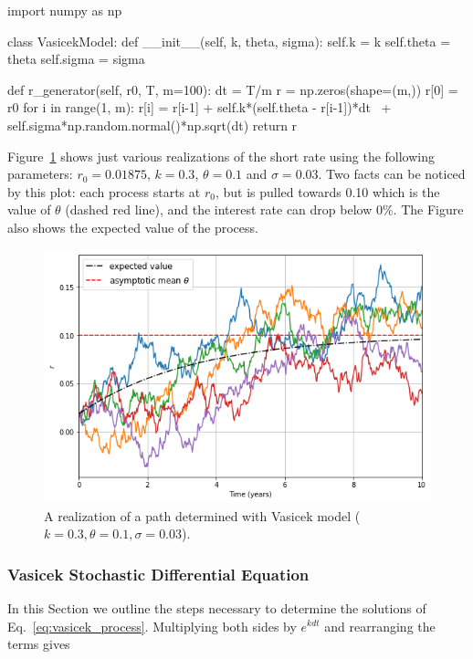 \begin{ipython}
import numpy as np

class VasicekModel:
    def __init__(self, k, theta, sigma):
        self.k = k
        self.theta = theta
        self.sigma = sigma

    def r_generator(self, r0, T, m=100):
        dt = T/m
        r = np.zeros(shape=(m,))
        r[0] = r0
        for i in range(1, m):
            r[i] = r[i-1] + self.k*(self.theta - r[i-1])*dt \   
                   + self.sigma*np.random.normal()*np.sqrt(dt)
        return r
\end{ipython}

Figure~\ref{fig:vasicek_path} shows just various realizations of the short rate using the following parameters: $r_0=0.01875$, $k=0.3$, $\theta=0.1$ and $\sigma=0.03$. 
Two facts can be noticed by this plot: each process starts at $r_0$, but is pulled towards 0.10 which is the value of $\theta$ (dashed red line), and the interest rate can drop below 0\%. The Figure also shows the expected value of the process.

\begin{figure}[htb]
  \centering
  \includegraphics[width=0.7\linewidth]{figures/vasicek_short_rate}
  \caption{A realization of a path determined with Vasicek model ($k=0.3, \theta=0.1, \sigma=0.03$).}
  \label{fig:vasicek_path}
\end{figure}

\subsubsection{Vasicek Stochastic Differential Equation}
\label{vasicek-stochastic-differential-equation}

In this Section we outline the steps necessary to determine the solutions of Eq.~\ref{eq:vasicek_process}.
Multiplying both sides by \(e^{kdt}\) and rearranging the terms gives

